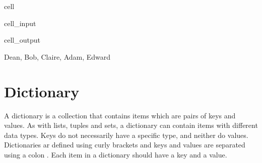 \documentclass[letterpaper,10pt,english]{jupyterBook}
\begin{document}
\begin{sphinxuseclass}{cell}\begin{sphinxVerbatimInput}

\begin{sphinxuseclass}{cell_input}
\begin{sphinxVerbatim}[commandchars=\\\{\}]
\end{sphinxVerbatim}

\end{sphinxuseclass}\end{sphinxVerbatimInput}
\begin{sphinxVerbatimOutput}

\begin{sphinxuseclass}{cell_output}
\begin{sphinxVerbatim}[commandchars=\\\{\}]
\PYGZob{}\PYGZsq{}Dean\PYGZsq{}, \PYGZsq{}Bob\PYGZsq{}, \PYGZsq{}Claire\PYGZsq{}, \PYGZsq{}Adam\PYGZsq{}, \PYGZsq{}Edward\PYGZsq{}\PYGZcb{}
\end{sphinxVerbatim}

\end{sphinxuseclass}\end{sphinxVerbatimOutput}

\end{sphinxuseclass}

\section{Dictionary}
\label{\detokenize{notebooks/02_Containers/02_Containers_student:dictionary}}
\sphinxAtStartPar
A dictionary is a collection that contains items which are pairs of keys and values. As with lists, tuples and sets, a dictionary can contain items with different data types. Keys do not necessarily have a specific type, and neither do values. Dictionaries ar defined using curly brackets \sphinxcode{\sphinxupquote{\{\}}} and keys and values are separated using a colon \sphinxcode{\sphinxupquote{:}}. Each item in a dictionary should have a key and a value.
\end{document}
